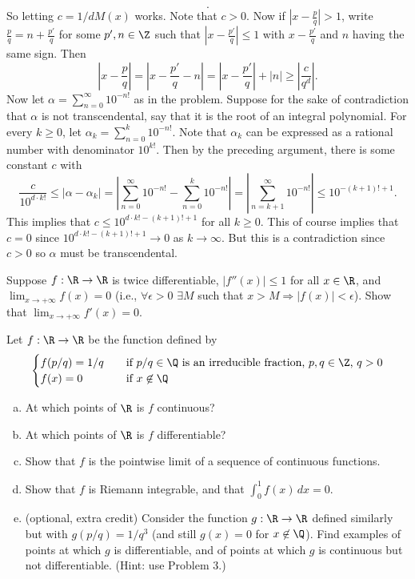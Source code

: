 \documentclass[11pt,letterpaper]{article}
\begin{document}
\begin{solution}
\[    .\] 
    So letting $c=1 /dM(x)$ works. Note that $c>0$. Now if $\left|x-\frac{p}{q}\right|> 1$, write $\frac{p}{q} = n+\frac{p'}{q}$ for some $p',n\in \Z$ such that $\left|x-\frac{p'}{q}\right|\leq 1$ with $x-\frac{p'}{q}$ and $n$ having the same sign. Then
    \[
        \left|x-\frac{p}{q}\right|=\left|x-\frac{p'}{q}-n\right|=\left|x-\frac{p'}{q}\right|+|n|\geq \left|\frac{c}{q^d}\right|
    .\]
    Now let $\alpha=\sum_{n=0}^\infty 10^{-n!}$ as in the problem. Suppose for the sake of contradiction that $\alpha$ is not transcendental, say that it is the root of an integral polynomial. For every $k\geq 0$, let $\alpha_k=\sum^k_{n=0}10^{-n!}$. Note that $\alpha_k$ can be expressed as a rational number with denominator $10^{k!}$. Then by the preceding argument, there is some constant $c$ with 
    \[
        \frac{c}{10^{d\cdot k!}}\leq \left|\alpha-\alpha_k\right|=\left|\sum^\infty_{n=0}10^{-n!}-\sum^k_{n=0}10^{-n!}\right|=\left|\sum^\infty_{n=k+1}10^{-n!}\right|\leq 10^{-(k+1)!+1}
    .\]   
    This implies that $c\leq  10^{d\cdot k!-(k+1)!+1}$ for all $k\geq 0$. This of course implies that $c=0$ since $10^{d\cdot k!-(k+1)!+1}\to 0$ as $k\to \infty$. But this is a contradiction since $c>0$ so $\alpha$ must be transcendental.
\end{solution}

\begin{problem}
    Suppose $f:\R\to \R$ is twice differentiable, $|f''(x)|\leq 1$ for all $x\in \R$, and $\lim_{x\to +\infty} f(x)=0$ (i.e., $\forall \epsilon>0$ $\exists M$ such that $x>M\Rightarrow |f(x)|<\epsilon$). Show that $\lim_{x\to +\infty} f'(x)=0$.
\end{problem}

\begin{problem}
    Let $f:\R \to \R$ be the function defined by
    \[
        \begin{cases} 
            f(p/q)=1/q \quad & \textrm{if $p/q\in \Q$ is an irreducible fraction, $p,q\in \Z$, $q>0$}\\ 
            f(x)=0 \quad & \textrm{if $x\not\in\Q$} 
        \end{cases}
    \]
    \begin{enumerate}[(a)]
        \item At which points of $\R$ is $f$ continuous?     
        \item At which points of $\R$ is $f$ differentiable?
        \item Show that $f$ is the pointwise limit of a sequence of continuous functions.
        \item Show that $f$ is Riemann integrable, and that $\int_0^1 f(x)\,dx=0$.
        \item (optional, extra credit) Consider the function $g:\R \to \R$ defined similarly but with $g(p/q)=1/q^3$ (and still $g(x)=0$ for $x\not\in\Q$). Find examples of points at which $g$ is differentiable, and of points at which $g$ is continuous but not differentiable. (Hint: use Problem 3.)
    \end{enumerate}
\end{problem}
\end{document}
